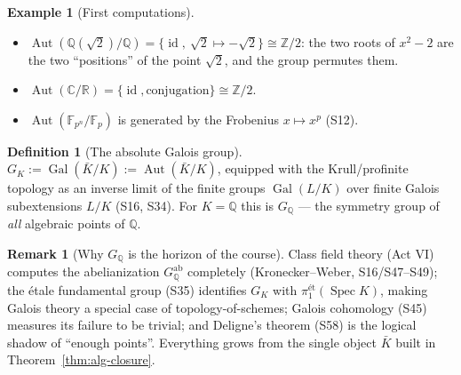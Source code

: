 \documentclass[11pt,a4paper]{article}
\theoremstyle{definition}
\newtheorem{definition}[theorem]{Definition}
\newtheorem{example}[theorem]{Example}
\newtheorem{remark}[theorem]{Remark}
\newcommand{\Z}{\mathbb{Z}}
\newcommand{\Q}{\mathbb{Q}}
\newcommand{\R}{\mathbb{R}}
\newcommand{\C}{\mathbb{C}}
\newcommand{\F}{\mathbb{F}}
\newcommand{\id}{\operatorname{id}}
\newcommand{\Gal}{\operatorname{Gal}}
\newcommand{\Aut}{\operatorname{Aut}}
\newcommand{\Spec}{\operatorname{Spec}}
\begin{document}
\begin{example}[First computations]\label{ex:first-galois}
\begin{itemize}
  \item $\Aut(\Q(\sqrt2)/\Q)=\{\id,\ \sqrt2\mapsto-\sqrt2\}\cong\Z/2$: the two roots of $x^2-2$ are the
    two ``positions'' of the point $\sqrt2$, and the group permutes them.
  \item $\Aut(\C/\R)=\{\id,\text{conjugation}\}\cong\Z/2$.
  \item $\Aut(\F_{p^n}/\F_p)$ is generated by the Frobenius $x\mapsto x^p$ (S12).
\end{itemize}
\end{example}

\begin{definition}[The absolute Galois group]
$G_K:=\Gal(\bar K/K):=\Aut(\bar K/K)$, equipped with the Krull/profinite topology as an inverse
limit of the finite groups $\Gal(L/K)$ over finite Galois subextensions $L/K$ (S16, S34). For
$K=\Q$ this is $G_\Q$ --- the symmetry group of \emph{all} algebraic points of $\Q$.
\end{definition}

\begin{remark}[Why $G_\Q$ is the horizon of the course]
Class field theory (Act VI) computes the abelianization $G_\Q^{\mathrm{ab}}$ completely
(Kronecker--Weber, S16/S47--S49); the \'etale fundamental group (S35) identifies $G_K$ with
$\pi_1^{\text{\'et}}(\Spec K)$, making Galois theory a special case of topology-of-schemes;
Galois cohomology (S45) measures its failure to be trivial; and Deligne's theorem (S58) is the
logical shadow of ``enough points''. Everything grows from the single object $\bar K$ built in
Theorem~\ref{thm:alg-closure}.
\end{remark}

\end{document}
